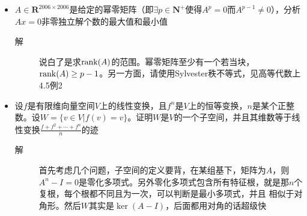 \begin{itemize}
\item $A\in \mathbf{R}^{2006 \times 2006}$是给定的幂零矩阵（即$\exists p\in \mathbf{N}^+$使得$A^p=0$而$A^{p-1}\neq 0$），分析$Ax=0$非零独立解个数的最大值和最小值
\begin{description}
\item[解] 说白了是求$\operatorname{rank}(A)$的范围。幂零矩阵至少有一个若当块，$\operatorname{rank}(A)\geq p-1$。另一方面，请使用Sylvester秩不等式，见高等代数上4.5例2
\end{description}

\item 设$f$是有限维向量空间$V$上的线性变换，且$f^n$是$V$上的恒等变换，$n$是某个正整数。设$W=\{v\in V|f(v)=v\}$。证明$W$是$V$的一个子空间，并且其维数等于线性变换$\frac{f+f^2+\cdots+f^n}{n}$的迹
\begin{description}
\item[解] 首先考虑几个问题，子空间的定义要背，在某组基下，矩阵为$A$，则$A^n-I=0$是零化多项式。另外零化多项式包含所有特征根，就是那$n$个复根，每个根都不同且为一次，可以判断是最小多项式，并且 相似于对角形。然后$W$其实是$\ker(A-I)$，后面都用对角的话超级快
\end{description}




























\end{itemize}